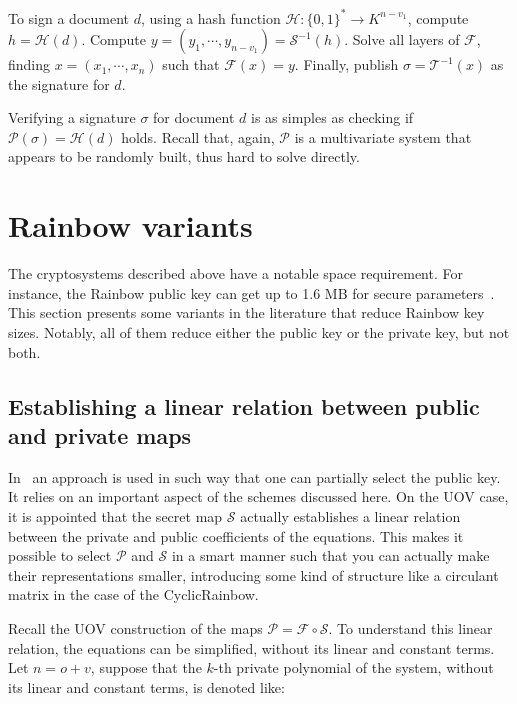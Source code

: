 \documentclass{ufsctex/ufsctex}
\begin{document}
To sign a document $d$, using a hash function $\mathcal{H}: \{0,1\}^* \to
K^{n-v_1}$, compute $h = \mathcal{H}(d)$. Compute $y = (y_1, \cdots, y_{n-v_1})
= \mathcal{S}^{-1}(h)$. Solve all layers of $\mathcal{F}$, finding $x = (x_1,
\cdots, x_n)$ such that $\mathcal{F}(x) = y$. Finally, publish $\sigma =
\mathcal{T}^{-1}(x)$ as the signature for $d$.

Verifying a signature $\sigma$ for document $d$ is as simples as checking if
$\mathcal{P}(\sigma) = \mathcal{H}(d)$ holds. Recall that, again, $\mathcal{P}$
is a multivariate system that appears to be randomly built, thus hard to solve
directly.

\section{Rainbow variants}\label{sec:rainbowvariants}

The cryptosystems described above have a notable space requirement. For
instance, the Rainbow public key can get up to 1.6 MB for secure
parameters~\cite{ding2017nist}. This section presents some variants in the
literature that reduce Rainbow key sizes. Notably, all of them reduce either
the public key or the private key, but not both.

\subsection{Establishing a linear relation between public and private maps}
\label{sec:relation}

In~\cite{petzoldt2010cyclicrainbow} an approach is used in such way that one
can partially select the public key. It relies on an important aspect of the
schemes discussed here. On the UOV case, it is appointed that the secret map
$\mathcal{S}$ actually establishes a linear relation between the private and
public coefficients of the equations. This makes it possible to select
$\mathcal{P}$ and $\mathcal{S}$ in a smart manner such that you can actually
make their representations smaller, introducing some kind of structure like a
circulant matrix in the case of the CyclicRainbow.

Recall the UOV construction of the maps $\mathcal{P} = \mathcal{F} \circ
\mathcal{S}$. To understand this linear relation, the equations can be
simplified, without its linear and constant terms. Let $n = o + v$, suppose
that the $k$-th private polynomial of the system, without its linear and
constant terms, is denoted like:
\end{document}
